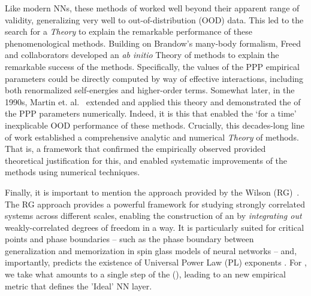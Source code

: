 Like modern NNs, these \SemiEmpirical methods of \QuantumChemistry
worked well beyond their apparent range of validity,
generalizing very well to out-of-distribution (OOD) data. This led to the
search for a \SemiEmpirical \emph{Theory} to explain the
remarkable performance of these phenomenological methods.
Building on Brandow’s many-body formalism, Freed and collaborators
\cite{freed1977, Freed1983}
developed an \emph{ab initio} \EffectiveHamiltonian
Theory of \SemiEmpirical methods to explain the remarkable success of the \SemiEmpirical methods.
Specifically, the values of the PPP empirical parameters could be directly computed by way of
effective interactions, including both renormalized self-energies and higher-order terms.
 Somewhat later, in the 1990s,
 Martin et. al.~\cite{MartinFreed1996, Martin1996, Martin1996_CPL, Martin1998}
 extended and applied this \EffectiveHamiltonian theory
 and demonstrated the \Universality of the \SemiEmpirical PPP parameters numerically.
 Indeed, it is this \Universality that enabled the `for a time' inexplicable
 OOD performance of these methods.
 Crucially, this decades-long line of work established a comprehensive
 analytic and numerical \emph{Theory} of \SemiEmpirical methods.
 That is, a framework that confirmed the empirically observed \Universality
 provided theoretical justification for this,
 and enabled systematic improvements of the methods using numerical techniques.

 Finally, it is important to mention the \EffectiveHamiltonian approach provided by the Wilson \emph{\RenormalizationGroup}
 (RG)~\cite{NobelPrizeRG,PhysRevLett.69.800}.
 The RG approach provides a powerful framework for studying strongly correlated systems across different scales,
 enabling the construction of an \EffectiveHamiltonian by \emph{integrating out} weakly-correlated degrees of freedom in a \ScaleInvariant way.
 It is particularly suited for critical points and phase boundaries --
 such as the phase boundary between generalization and memorization in spin glass models of neural networks --
 and, importantly, predicts the existence of Universal Power Law (PL) exponents .
For \SETOL, we take what amounts to a single step of the \emph{\ExactRenormalizationGroup} (\ERG), leading to an new empirical metric
that defines the 'Ideal' NN layer.

